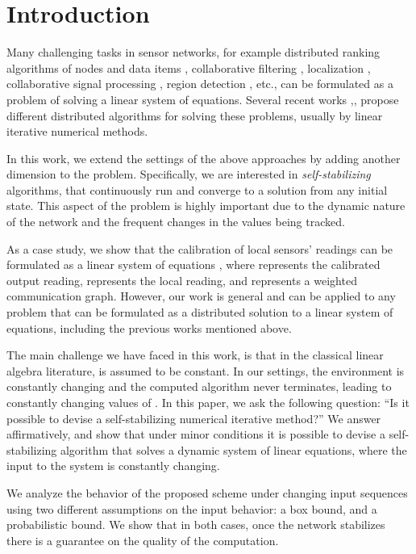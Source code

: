 \documentclass[preprint,12pt]{elsarticle}
\begin{document}
\section{Introduction}
Many challenging tasks in sensor networks, for example distributed ranking algorithms
of nodes and data items \cite{PPNA08}, collaborative filtering \cite{KorenCF},
localization \cite{SensorLocalization}, collaborative signal
processing \cite{SignalProcessing}, region detection
\cite{RegionDetection}, etc., can be formulated as a problem of solving a linear system of
equations. Several recent works \cite{SensorLocalization},\cite{SignalProcessing},\cite{RegionDetection} propose different distributed
algorithms for solving these problems, usually by linear iterative numerical
methods.

In this work, we extend the settings of the above approaches by
adding another dimension to the problem. Specifically, we are
interested in {\em self-stabilizing} algorithms, that continuously run
and converge to a solution from any initial
state. This aspect of the problem is highly important due to the dynamic
nature of the network and the frequent changes in the
values being tracked.

As a case study, we show that the calibration of local sensors' readings can be formulated as a
linear system of equations , where  represents
the calibrated output reading,  represents the local reading, and 
represents a weighted communication graph. However, our work is general and
can be applied to any problem that can be formulated as a distributed solution to a
linear system of equations, including the previous works mentioned above.

The main challenge we have faced in this work, is that in the
classical linear algebra literature,  is assumed to be constant.
In our settings, the environment is constantly changing and the
computed algorithm never terminates, leading to constantly
changing values of . In this paper, we ask the following question: ``Is it possible to
devise a self-stabilizing numerical iterative method?'' We answer
affirmatively, and show that under minor conditions it is possible
to devise a self-stabilizing algorithm that solves a dynamic
system of linear equations, where the input to the system is
constantly changing.

We analyze the behavior of the proposed scheme under changing input sequences
using two different assumptions on the input behavior: a box bound, and a probabilistic bound.
We show that in both cases, once the network stabilizes there is a guarantee on
the quality of the computation.
\end{document}
